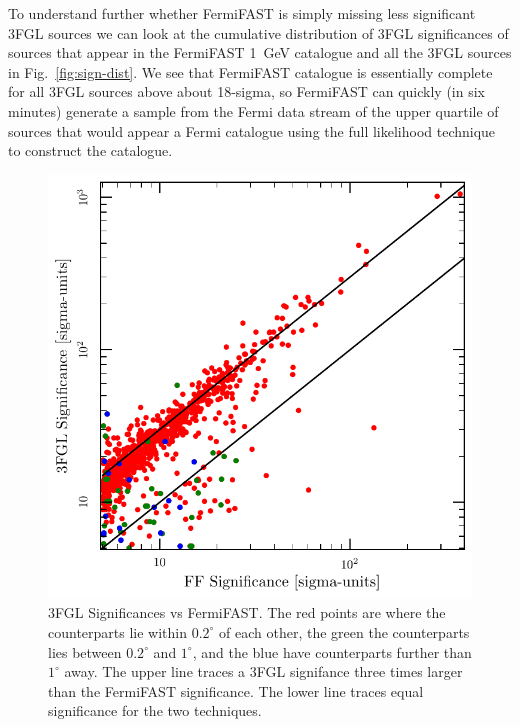 \documentclass[useAMS,usenatbib]{mn2e}
\begin{document}
To understand further whether FermiFAST is simply missing less
significant 3FGL sources we can look at the cumulative distribution of
3FGL significances of sources that appear in the FermiFAST 1~GeV
catalogue and all the 3FGL sources in Fig.~\ref{fig:sign-dist}.  We
see that FermiFAST catalogue is essentially complete for all 3FGL
sources above about 18-sigma, so FermiFAST can quickly (in six minutes)
generate a sample from the Fermi data stream of the upper quartile of
sources that would appear a Fermi catalogue using the full likelihood
technique to construct the catalogue.
\begin{figure}
\includegraphics[width=\columnwidth]{sign-comp}
\caption{3FGL Significances vs FermiFAST.  The red points are where
  the counterparts lie within $0.2^\circ$ of each other, the green the
  counterparts lies between $0.2^\circ$ and $1^\circ$, and the blue
  have counterparts further than $1^\circ$ away. The upper line traces
  a 3FGL signifance three times larger than the FermiFAST
  significance.  The lower line traces equal significance for the two techniques.
}
\label{fig:fermi_comp}
\end{figure}
\end{document}
